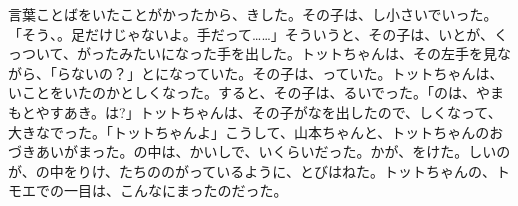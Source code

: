 {言葉}{ことば}をいたことがかったから、きした。その子は、し小さいでいった。「そう、。足だけじゃないよ。手だって……」そういうと、その子は、いとが、くっついて、がったみたいになった手を出した。トットちゃんは、その左手を見ながら、「らないの？」とになっていた。その子は、っていた。トットちゃんは、いことをいたのかとしくなった。すると、その子は、るいでった。「のは、やまもとやすあき。は?」トットちゃんは、その子がなを出したので、しくなって、大きなでった。「トットちゃんよ」こうして、山本ちゃんと、トットちゃんのおづきあいがまった。の中は、かいしで、いくらいだった。かが、をけた。しいのが、の中をりけ、たちののがっているように、とびはねた。トットちゃんの、トモエでの一目は、こんなにまったのだった。


